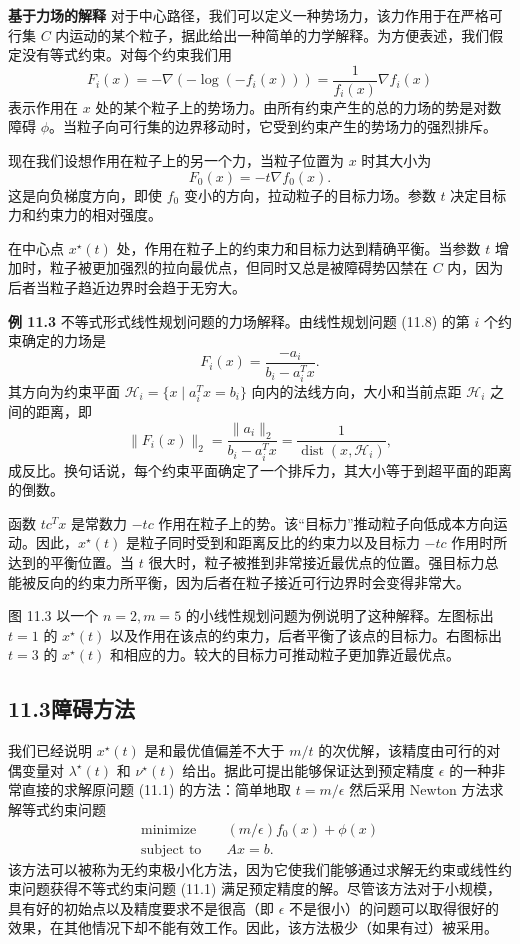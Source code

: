 \documentclass[UTF8,12pt,a4paper,fontset=fandol]{ctexart}
\begin{document}
\noindent\textbf{基于力场的解释}\quad
对于中心路径，我们可以定义一种势场力，该力作用于在严格可行集 $C$ 内运动的某个粒子，据此给出一种简单的力学解释。为方便表述，我们假定没有等式约束。对每个约束我们用
\[
F_i(x)=-\nabla(-\log(-f_i(x)))=\frac{1}{f_i(x)}\nabla f_i(x)
\]
表示作用在 $x$ 处的某个粒子上的势场力。由所有约束产生的总的力场的势是对数障碍 $\phi$。当粒子向可行集的边界移动时，它受到约束产生的势场力的强烈排斥。

现在我们设想作用在粒子上的另一个力，当粒子位置为 $x$ 时其大小为
\[
F_0(x)=-t\nabla f_0(x).
\]
这是向负梯度方向，即使 $f_0$ 变小的方向，拉动粒子的目标力场。参数 $t$ 决定目标力和约束力的相对强度。

在中心点 $x^\star(t)$ 处，作用在粒子上的约束力和目标力达到精确平衡。当参数 $t$ 增加时，粒子被更加强烈的拉向最优点，但同时又总是被障碍势囚禁在 $C$ 内，因为后者当粒子趋近边界时会趋于无穷大。

\noindent\textbf{例 11.3}\quad
不等式形式线性规划问题的力场解释。由线性规划问题 (11.8) 的第 $i$ 个约束确定的力场是
\[
F_i(x)=\frac{-a_i}{b_i-a_i^Tx}.
\]
其方向为约束平面 $\mathcal{H}_i=\{x\mid a_i^Tx=b_i\}$ 向内的法线方向，大小和当前点距 $\mathcal{H}_i$ 之间的距离，即
\[
\|F_i(x)\|_2=\frac{\|a_i\|_2}{b_i-a_i^Tx}=\frac{1}{\operatorname{dist}(x,\mathcal{H}_i)},
\]
成反比。换句话说，每个约束平面确定了一个排斥力，其大小等于到超平面的距离的倒数。

函数 $tc^Tx$ 是常数力 $-tc$ 作用在粒子上的势。该``目标力''推动粒子向低成本方向运动。因此，$x^\star(t)$ 是粒子同时受到和距离反比的约束力以及目标力 $-tc$ 作用时所达到的平衡位置。当 $t$ 很大时，粒子被推到非常接近最优点的位置。强目标力总能被反向的约束力所平衡，因为后者在粒子接近可行边界时会变得非常大。

图 11.3 以一个 $n=2,m=5$ 的小线性规划问题为例说明了这种解释。左图标出 $t=1$ 的 $x^\star(t)$ 以及作用在该点的约束力，后者平衡了该点的目标力。右图标出 $t=3$ 的 $x^\star(t)$ 和相应的力。较大的目标力可推动粒子更加靠近最优点。

\subsection*{11.3\quad 障碍方法}

我们已经说明 $x^\star(t)$ 是和最优值偏差不大于 $m/t$ 的次优解，该精度由可行的对偶变量对 $\lambda^\star(t)$ 和 $\nu^\star(t)$ 给出。据此可提出能够保证达到预定精度 $\epsilon$ 的一种非常直接的求解原问题 (11.1) 的方法：简单地取 $t=m/\epsilon$ 然后采用 Newton 方法求解等式约束问题
\[
\begin{aligned}
\text{minimize}\quad & (m/\epsilon)f_0(x)+\phi(x)\\
\text{subject to}\quad & Ax=b.
\end{aligned}
\]
该方法可以被称为无约束极小化方法，因为它使我们能够通过求解无约束或线性约束问题获得不等式约束问题 (11.1) 满足预定精度的解。尽管该方法对于小规模，具有好的初始点以及精度要求不是很高（即 $\epsilon$ 不是很小）的问题可以取得很好的效果，在其他情况下却不能有效工作。因此，该方法极少（如果有过）被采用。
\end{document}
